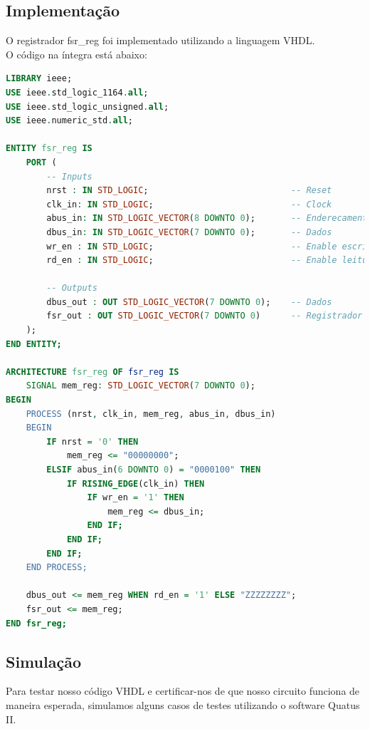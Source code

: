 \documentclass{article}
\begin{document}
\subsection{Implementação}

O registrador fsr\_reg foi implementado utilizando a linguagem VHDL.\\

O código na íntegra está abaixo:\\

\begin{lstlisting}[language=VHDL, caption={Código VHDL fsr\_reg}]
LIBRARY ieee;
USE ieee.std_logic_1164.all;
USE ieee.std_logic_unsigned.all;
USE ieee.numeric_std.all;

ENTITY fsr_reg IS
    PORT (
        -- Inputs
        nrst : IN STD_LOGIC;                            -- Reset
        clk_in: IN STD_LOGIC;                           -- Clock
        abus_in: IN STD_LOGIC_VECTOR(8 DOWNTO 0);       -- Enderecamento
        dbus_in: IN STD_LOGIC_VECTOR(7 DOWNTO 0);       -- Dados
        wr_en : IN STD_LOGIC;                           -- Enable escrita
        rd_en : IN STD_LOGIC;                           -- Enable leitura

        -- Outputs
        dbus_out : OUT STD_LOGIC_VECTOR(7 DOWNTO 0);    -- Dados
        fsr_out : OUT STD_LOGIC_VECTOR(7 DOWNTO 0)      -- Registrador
    );
END ENTITY;

ARCHITECTURE fsr_reg OF fsr_reg IS
    SIGNAL mem_reg: STD_LOGIC_VECTOR(7 DOWNTO 0);
BEGIN
    PROCESS (nrst, clk_in, mem_reg, abus_in, dbus_in)
    BEGIN
        IF nrst = '0' THEN
            mem_reg <= "00000000";
        ELSIF abus_in(6 DOWNTO 0) = "0000100" THEN
            IF RISING_EDGE(clk_in) THEN
                IF wr_en = '1' THEN
                    mem_reg <= dbus_in;
                END IF;
            END IF;
        END IF;
    END PROCESS;

    dbus_out <= mem_reg WHEN rd_en = '1' ELSE "ZZZZZZZZ";
    fsr_out <= mem_reg;
END fsr_reg;    
\end{lstlisting}

\subsection{Simulação}

Para testar nosso código VHDL e certificar-nos de que nosso circuito funciona de maneira esperada, simulamos alguns casos de testes utilizando o software Quatus II.\\
\end{document}
